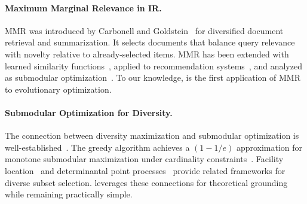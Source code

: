 \paragraph{Maximum Marginal Relevance in IR.}
MMR was introduced by Carbonell and Goldstein~\cite{carbonell1998use} for diversified document retrieval and summarization.
It selects documents that balance query relevance with novelty relative to already-selected items.
MMR has been extended with learned similarity functions~\cite{xia2015learning}, applied to recommendation systems~\cite{agrawal2009diversifying}, and analyzed as submodular optimization~\cite{lin2011class}.
To our knowledge, \mmr is the first application of MMR to evolutionary optimization.

\paragraph{Submodular Optimization for Diversity.}
The connection between diversity maximization and submodular optimization is well-established~\cite{nemhauser1978analysis, krause2014submodular}.
The greedy algorithm achieves a $(1 - 1/e)$ approximation for monotone submodular maximization under cardinality constraints~\cite{nemhauser1978analysis}.
Facility location~\cite{cornuejols1977uncapacitated} and determinantal point processes~\cite{kulesza2012determinantal} provide related frameworks for diverse subset selection.
\mmr leverages these connections for theoretical grounding while remaining practically simple.
